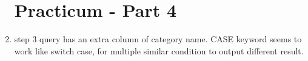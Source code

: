 \documentclass[12pt,titlepage]{article}
\begin{document}
\begin{enumerate}
    \section*{Practicum - Part 4}
    \item step 3 query has an extra column of category name. CASE keyword seems to work like switch case, for multiple similar condition to output different result. \\
\end{enumerate}
\end{document}
